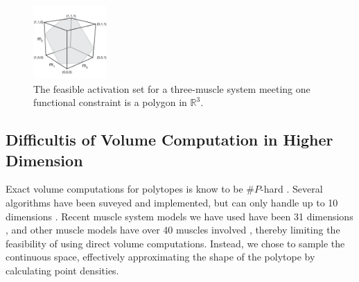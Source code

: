 \begin{figure}[ht]
  \label{fig:fig_hr}
   \begin{center}
    \includegraphics[width=0.25\textwidth]{sections/figs/feasibleactivation.png}
  \end{center}
  \caption{The feasible activation set for a  three-muscle system meeting one functional constraint is a polygon in $\mathbb{R}^3$.} %
\end{figure}

\subsection{Difficultis of Volume Computation in Higher Dimension}

Exact volume computations for polytopes is know to be $\#P$-hard \cite{Dyer}. Several algorithms have been suveyed and implemented, but can only handle up to 10 dimensions \cite{Bueler2}.  
Recent muscle system models we have used have been 31 dimensions \cite{Valero-Cuevas2015high-dimensional}, and other muscle models have over 40 muscles involved \cite{arnold2010model, kutch2012challenges, hamner2010muscle, de2014human}, thereby limiting the feasibility of using direct volume computations. Instead, we chose to sample the continuous space, effectively approximating the shape of the polytope by calculating point densities. %

